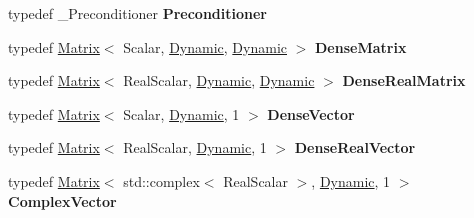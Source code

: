 \begin{DoxyCompactItemize}
typedef \+\_\+\+Preconditioner {\bfseries Preconditioner}
\item 
\mbox{\label{class_eigen_1_1_d_g_m_r_e_s_a87d1411656955d8c3f053cfc2be4a856}} 
typedef \hyperlink{group___core___module_class_eigen_1_1_matrix}{Matrix}$<$ Scalar, \hyperlink{namespace_eigen_ad81fa7195215a0ce30017dfac309f0b2}{Dynamic}, \hyperlink{namespace_eigen_ad81fa7195215a0ce30017dfac309f0b2}{Dynamic} $>$ {\bfseries Dense\+Matrix}
\item 
\mbox{\label{class_eigen_1_1_d_g_m_r_e_s_a4c15bd34c5956f8b78020dc5c0d2e667}} 
typedef \hyperlink{group___core___module_class_eigen_1_1_matrix}{Matrix}$<$ Real\+Scalar, \hyperlink{namespace_eigen_ad81fa7195215a0ce30017dfac309f0b2}{Dynamic}, \hyperlink{namespace_eigen_ad81fa7195215a0ce30017dfac309f0b2}{Dynamic} $>$ {\bfseries Dense\+Real\+Matrix}
\item 
\mbox{\label{class_eigen_1_1_d_g_m_r_e_s_a1d85b943c99dabf606c6c537e550b11b}} 
typedef \hyperlink{group___core___module_class_eigen_1_1_matrix}{Matrix}$<$ Scalar, \hyperlink{namespace_eigen_ad81fa7195215a0ce30017dfac309f0b2}{Dynamic}, 1 $>$ {\bfseries Dense\+Vector}
\item 
\mbox{\label{class_eigen_1_1_d_g_m_r_e_s_a9ffdf6b47010f636fcc1a071a9e9e16c}} 
typedef \hyperlink{group___core___module_class_eigen_1_1_matrix}{Matrix}$<$ Real\+Scalar, \hyperlink{namespace_eigen_ad81fa7195215a0ce30017dfac309f0b2}{Dynamic}, 1 $>$ {\bfseries Dense\+Real\+Vector}
\item 
\mbox{\label{class_eigen_1_1_d_g_m_r_e_s_aeace9fdbc1373362c29409003482d66a}} 
typedef \hyperlink{group___core___module_class_eigen_1_1_matrix}{Matrix}$<$ std\+::complex$<$ Real\+Scalar $>$, \hyperlink{namespace_eigen_ad81fa7195215a0ce30017dfac309f0b2}{Dynamic}, 1 $>$ {\bfseries Complex\+Vector}
\end{DoxyCompactItemize}
